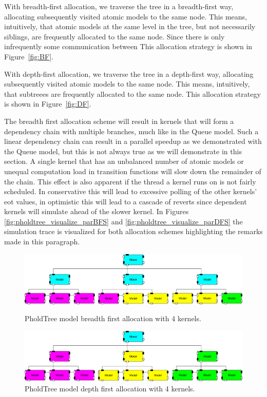 With breadth-first allocation, we traverse the tree in a breadth-first way, allocating subsequently visited atomic models to the same node.
This means, intuitively, that atomic models at the same level in the tree, but not necessarily siblings, are frequently allocated to the same node.
Since there is only infrequently some communication between 
This allocation strategy is shown in Figure~\ref{fig:BF}.

With depth-first allocation, we traverse the tree in a depth-first way, allocating subsequently visited atomic models to the same node.
This means, intuitively, that subtreees are frequently allocated to the same node.
This allocation strategy is shown in Figure~\ref{fig:DF}.

The breadth first allocation scheme will result in kernels that will form a dependency chain with multiple branches, much like in the Queue model.
Such a linear dependency chain can result in a parallel speedup as we demonstrated with the Queue model, but this is not always true as we will demonstrate in this section.
A single kernel that has an unbalanced number of atomic models or unequal computation load in transition functions will slow down the remainder of the chain. This effect is also apparent if the thread a kernel runs on is not fairly scheduled. In conservative this will lead to excessive polling of the other kernels' eot values, in optimistic this will lead to a cascade of reverts since dependent kernels will simulate ahead of the slower kernel. In Figures \ref{fig:pholdtree_visualize_parBFS} and \ref{fig:pholdtree_visualize_parDFS} the simulation trace is visualized for both allocation schemes highlighting the remarks made in this paragraph.
\begin{figure}
   \center
   
   \includegraphics[width=\modelfraction\columnwidth]{fig/pholdtree_alloc_BF.pdf}
   \caption{PholdTree model breadth first allocation with 4 kernels.}
   \label{fig:PholdTree_model_bfs}
   
   \includegraphics[width=\modelfraction\columnwidth]{fig/pholdtree_alloc_DF.pdf}
   \caption{PholdTree model depth first allocation with 4 kernels.}
   \label{fig:PholdTree_model_dfs}
\end{figure}

